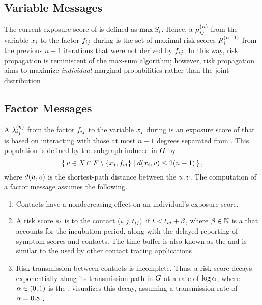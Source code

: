 \subsection{Variable Messages}

The current exposure score of  is defined as $\max S_i$. Hence, a  $\mu_{ij}^{(n)}$ from the variable \vertexName $\vVariable[i]$ to the factor \vertexName $\vFactor[ij]$ during  is the set of maximal risk scores $R_{i}^{(n - 1)}$ from the previous $n - 1$ iterations that were not derived by $\vFactor[ij]$. In this way, risk propagation is reminiscent of the max-sum algorithm; however, risk propagation aims to maximize \emph{individual} marginal probabilities rather than the joint distribution \citep[pp. 411--415]{Bishop2006}.

\subsection{Factor Messages}

A  $\lambda_{ij}^{(n)}$ from the factor \vertexName $\vFactor[ij]$ to the variable \vertexName $\vVariable[j]$ during  is an exposure score of  that is based on interacting with those at most $n - 1$ degrees separated from . This population is defined by the subgraph induced in $G$ by
\begin{equation*}
  \setBuilder{\vVertex \in \vVariables \cap \vFactors \setminus \{\vVariable[j], \vFactor[ij]\}}{\dist(\vVariable[i], \vVertex) \leq 2(n - 1)},
\end{equation*}
where $d(u, v)$ is the shortest-path distance between the \verticesName $u, v$. The computation of a factor message assumes the following.
\begin{enumerate}
  \item Contacts have a nondecreasing effect on an individual's exposure score.
  \item A risk score $s_t$ is  to the contact $(i, j, t_{ij})$ if $t < t_{ij} +\beta$, where $\beta \in \mathbb{N}$ is a  that accounts for the incubation period, along with the delayed reporting of symptom scores and contacts. The time buffer is also known as the  \citep{Raymenants2022} and is similar to the  used by other contact tracing applications \citep{Leng2022}.
  \item Risk transmission between contacts is incomplete. Thus, a risk score decays exponentially along its transmission path in $G$ at a rate of $\log \alpha$, where $\alpha \in (0, 1)$ is the .  visualizes this decay, assuming a transmission rate of $\alpha = 0.8$ \citep{Hamner2020}.\end{enumerate}

